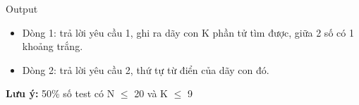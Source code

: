 Output
\begin{itemize}
	\item 

     Dòng 1: trả lời yêu cầu 1, ghi ra dãy con K phần tử tìm được, giữa 2 số có 1 khoảng trắng.    
	\item     Dòng 2: trả lời yêu cầu 2, thứ tự từ điển của dãy con đó.   
\end{itemize}

\textbf{    Lưu ý:   }   50\% số test có N $\le$ 20 và K $\le$ 9  
\begin{itemize}
\end{itemize}